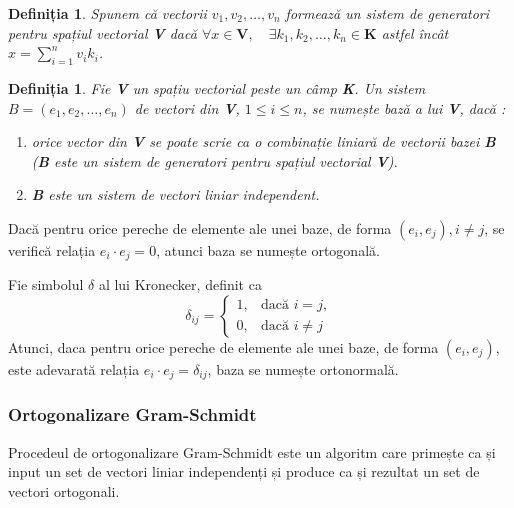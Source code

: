 \newtheorem{th_generator}[def_dotproduct]{Definiția}
\begin{th_generator}
Spunem că vectorii $v_1, v_2, \dots, v_n$ formează un sistem de generatori
pentru spațiul vectorial \textbf{V} dacă $\forall x \in \mathbf{V}, \quad
\exists k_1, k_2, \dots, k_n \in \mathbf{K}$ astfel încât $x = \sum_{i
= 1}^{n}v_ik_i$.
\end{th_generator}

\newtheorem{th_vector_basis}[def_dotproduct]{Definiția}
\begin{th_vector_basis}
Fie \textbf{V} un spațiu vectorial peste un câmp \textbf{K}. Un sistem $B = (
e_1, e_2, \dots, e_n )$ de vectori din \textbf{V}, $1 \leq i \leq n$, se 
numește bază a lui \textbf{V}, dacă :
\begin{enumerate}
  \item orice vector din \textbf{V} se poate scrie ca o combinație liniară de
  vectorii bazei \textbf{B} (\textbf{B} este un sistem de generatori pentru
  spațiul vectorial \textbf{V}).
  \item \textbf{B} este un sistem de vectori liniar independent.
\end{enumerate}
\end{th_vector_basis}

Dacă pentru orice pereche de elemente ale unei baze, de forma $(e_i, e_j), i
\neq j$, se verifică relația $e_i \cdot e_j = 0$, atunci baza se numește
ortogonală.

Fie simbolul $\delta$ al lui Kronecker, definit ca 
\begin{equation}
\delta_{ij} =
\begin{cases}
1, & \text{dacă } i = j, \\
0, & \text{dacă } i \neq j 
\end{cases}
\end{equation}
Atunci, daca pentru orice pereche de elemente ale unei baze, de forma $(e_i,
e_j)$, este adevarată relația $e_i \cdot e_j = \delta_{ij}$, baza se numește
ortonormală.

\subsubsection{Ortogonalizare Gram-Schmidt}
\label{ch1:sec_vectors:sub_vector_spaces:sub_sub_gram_schmidt}
Procedeul de ortogonalizare Gram-Schmidt este un algoritm care primește ca și
input un set de vectori liniar independenți și produce ca și rezultat un set de
vectori ortogonali.

